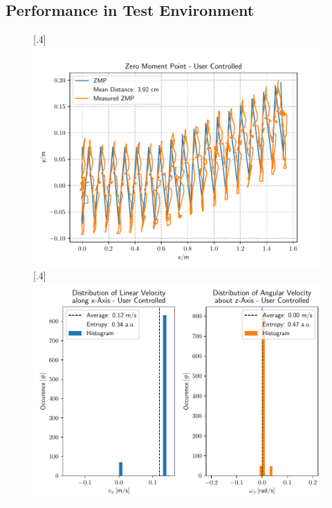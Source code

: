 \subsection{Performance in Test Environment}
\begin{figure}[h]
	\centering
	[.4\linewidth]{\includegraphics[scale=.35]{chapters/05_experiments/01_user_controlled_walking/02_test_environment/straight_walk_01_zmp.pdf}}
	[.4\linewidth]{\includegraphics[scale=.35]{chapters/05_experiments/01_user_controlled_walking/02_test_environment/straight_walk_01_entropy.pdf}}

\end{figure}
